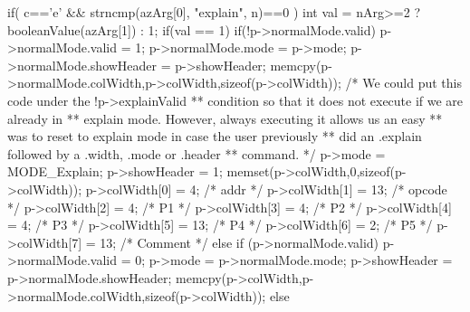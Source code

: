 \begin{Codex}[label=shell.c,numbers=left]
{  if( c=='e' && strncmp(azArg[0], "explain", n)==0 ){
    int val = nArg>=2 ? booleanValue(azArg[1]) : 1;
    if(val == 1) {
      if(!p->normalMode.valid) {
        p->normalMode.valid = 1;
        p->normalMode.mode = p->mode;
        p->normalMode.showHeader = p->showHeader;
        memcpy(p->normalMode.colWidth,p->colWidth,sizeof(p->colWidth));
      }
      /* We could put this code under the !p->explainValid
      ** condition so that it does not execute if we are already in
      ** explain mode. However, always executing it allows us an easy
      ** was to reset to explain mode in case the user previously
      ** did an .explain followed by a .width, .mode or .header
      ** command.
      */
      p->mode = MODE_Explain;
      p->showHeader = 1;
      memset(p->colWidth,0,sizeof(p->colWidth));
      p->colWidth[0] = 4;                  /* addr */
      p->colWidth[1] = 13;                 /* opcode */
      p->colWidth[2] = 4;                  /* P1 */
      p->colWidth[3] = 4;                  /* P2 */
      p->colWidth[4] = 4;                  /* P3 */
      p->colWidth[5] = 13;                 /* P4 */
      p->colWidth[6] = 2;                  /* P5 */
      p->colWidth[7] = 13;                  /* Comment */
    }else if (p->normalMode.valid) {
      p->normalMode.valid = 0;
      p->mode = p->normalMode.mode;
      p->showHeader = p->normalMode.showHeader;
      memcpy(p->colWidth,p->normalMode.colWidth,sizeof(p->colWidth));
    }
  }else

}
\end{Codex}
